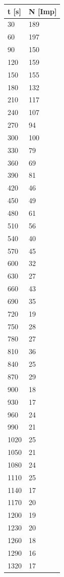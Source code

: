 \documentclass[titlepage=firstcover, captions=tableheading]{scrartcl}
\begin{document}
\begin{minipage}{\linewidth}
    \begin{table}[H]
        \centering
    
    \begin{tabular}{ll}
        \toprule
        t [s] & N [Imp] \\
        \midrule
        30	& 189 \\
        60	& 197 \\
        90	& 150 \\
        120	& 159 \\
        150	& 155 \\
        180	& 132 \\
        210	& 117 \\
        240	& 107 \\
        270	& 94 \\
        300	& 100 \\
        330	& 79 \\
        360	& 69 \\
        390	& 81 \\
        420	& 46 \\
        450	& 49 \\
        480	& 61 \\
        510	& 56 \\
        540	& 40 \\
        570	& 45 \\
        600	& 32 \\
        630	& 27 \\
        660	& 43 \\
        690	& 35 \\
        720	& 19 \\
        750	& 28 \\
        780	& 27 \\
        810	& 36 \\
        840	& 25 \\
        870	& 29 \\
        900	& 18 \\
        930	& 17 \\
        960	& 24 \\
        990	& 21 \\
        1020 &	25 \\
        1050 &	21 \\
        1080 &	24 \\
        1110 &	25 \\
        1140 &	17 \\
        1170 &	20 \\
        1200 &	19 \\
        1230 &	20 \\
        1260 &	18 \\
        1290 &	16 \\
        1320 &	17 \\
        \bottomrule
        
    \end{tabular}
    \label{tab:2}
\end{table}
\end{minipage}
\end{document}

